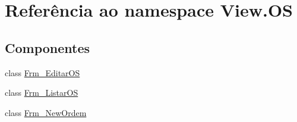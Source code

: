 \hypertarget{namespace_view_1_1_o_s}{}\section{Referência ao namespace View.\+O\+S}
\label{namespace_view_1_1_o_s}
\subsection*{Componentes}
\begin{DoxyCompactItemize}
\item 
class \hyperlink{class_view_1_1_o_s_1_1_frm___editar_o_s}{Frm\+\_\+\+Editar\+O\+S}
\item 
class \hyperlink{class_view_1_1_o_s_1_1_frm___listar_o_s}{Frm\+\_\+\+Listar\+O\+S}
\item 
class \hyperlink{class_view_1_1_o_s_1_1_frm___new_ordem}{Frm\+\_\+\+New\+Ordem}
\end{DoxyCompactItemize}

